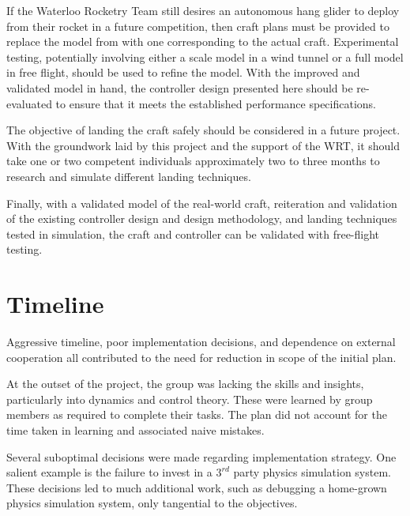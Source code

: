 \documentclass{sydeStyle}
\begin{document}
If the Waterloo Rocketry Team still desires an autonomous hang glider to deploy
from their rocket in a future competition, then craft plans must be provided to
replace the model from \cite{spottiswoode} with one corresponding to the actual
craft.  Experimental testing, potentially involving either a scale model in a
wind tunnel or a full model in free flight, should be used to refine the model.
With the improved and validated model in hand, the controller design presented
here should be re-evaluated to ensure that it meets the established performance
specifications.

The objective of landing the craft safely should be considered in a future
project.  With the groundwork laid by this project and the support of the WRT,
it should take one or two competent individuals approximately two to three
months to research and simulate different landing techniques.

Finally, with a validated model of the real-world craft, reiteration and
validation of the existing controller design and design methodology, and landing
techniques tested in simulation, the craft and controller can be validated with
free-flight testing.

\appendix

\chapter{Timeline}


Aggressive timeline, poor implementation decisions, and dependence on external
cooperation all contributed to the need for reduction in scope of the initial
plan.

At the outset of the project, the group was lacking the skills and insights,
particularly into dynamics and control theory. These were learned by group
members as required to complete their tasks. The plan did not account for the
time taken in learning and associated naive mistakes.

Several suboptimal decisions were made regarding implementation strategy. One
salient example is the failure to invest in a $3^{rd}$ party physics simulation
system. These decisions led to much additional work, such as debugging a
home-grown physics simulation system, only tangential to the objectives.
\end{document}

